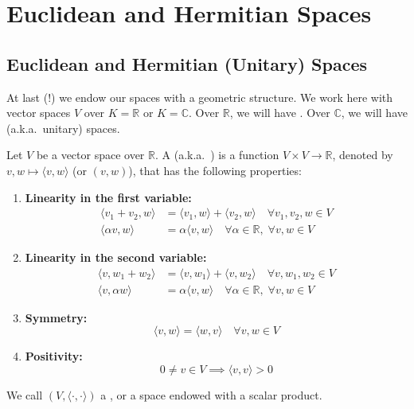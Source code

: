 \setcounter{chapter}{21}
\renewcommand{\thetheorem}{22.a.\arabic{theorem}}
\setcounter{theorem}{0}

\chapter{Euclidean and Hermitian Spaces}

\section{Euclidean and Hermitian (Unitary) Spaces}

At last (!) we endow our spaces with a geometric structure. We work here with vector spaces $V$ over $K = \mathbb{R}$ or $K = \mathbb{C}$. Over $\mathbb{R}$, we will have . Over $\mathbb{C}$, we will have  (a.k.a.\ unitary) spaces.

\begin{definition}
\label{def:scalar_product_real}
Let $V$ be a vector space over $\mathbb{R}$. A  (a.k.a.\ ) is a function $V \times V \longrightarrow \mathbb{R}$, denoted by $v, w \mapsto \langle v, w \rangle$ (or $(v,w)$), that has the following properties:
\begin{enumerate}
    \item \textbf{Linearity in the first variable:}
    \begin{align*}
        \langle v_1 + v_2, w \rangle &= \langle v_1, w \rangle + \langle v_2, w \rangle \quad \forall v_1, v_2, w \in V \\
        \langle \alpha v, w \rangle &= \alpha \langle v, w \rangle \quad \forall \alpha \in \mathbb{R}, \; \forall v, w \in V
    \end{align*}
    \item \textbf{Linearity in the second variable:}
    \begin{align*}
        \langle v, w_1 + w_2 \rangle &= \langle v, w_1 \rangle + \langle v, w_2 \rangle \quad \forall v, w_1, w_2 \in V \\
        \langle v, \alpha w \rangle &= \alpha \langle v, w \rangle \quad \forall \alpha \in \mathbb{R}, \; \forall v, w \in V
    \end{align*}
    \item \textbf{Symmetry:}
    \[
        \langle v, w \rangle = \langle w, v \rangle \quad \forall v, w \in V
    \]
    \item \textbf{Positivity:}
    \[
        0 \neq v \in V \implies \langle v, v \rangle > 0
    \]
\end{enumerate}
We call $(V, \langle \cdot, \cdot \rangle)$ a , or a space endowed with a scalar product.
\end{definition}

